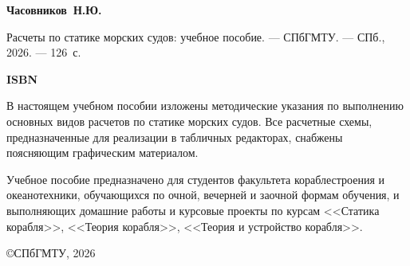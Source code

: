 \vspace{1.0cm}

\textbf{Часовников~Н.Ю.}

Расчеты по статике морских судов: учебное пособие. --- СПбГМТУ. --- СПб., 2026. --- 126~с.

\vspace{0.5cm}

\textbf{ISBN}

\vspace{0.5cm}

В настоящем учебном пособии изложены методические указания по выполнению основных видов расчетов по статике морских судов.
Все расчетные схемы, предназначенные для реализации в табличных редакторах, снабжены поясняющим графическим материалом.

Учебное пособие предназначено для студентов факультета кораблестроения и океанотехники, обучающихся по очной, вечерней и заочной формам обучения, и выполняющих домашние работы и курсовые проекты по курсам <<Статика корабля>>, <<Теория корабля>>, <<Теория и устройство корабля>>.

\vspace{3.5cm}

{\footnotesize
\copyright СПбГМТУ, 2026}
